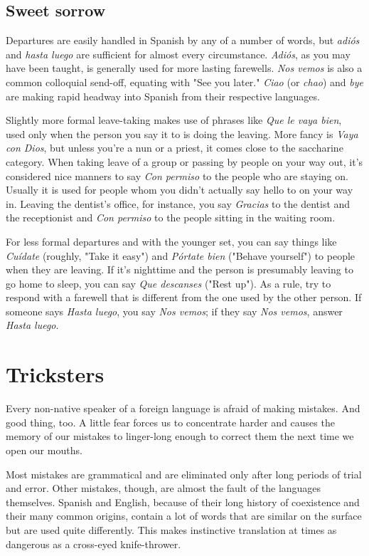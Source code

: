 \documentclass[14pt,a4paper,oneside]{memoir}
\begin{document}
\section{Sweet sorrow}

Departures are easily handled in Spanish by any of a number
of words, but \emph{adiós} and \emph{hasta luego} are sufficient for almost every circumstance. \emph{Adiós}, as you may have been taught, is generally used for
more lasting farewells. \emph{Nos vemos} is also a common colloquial send-off, equating with "See you later." \emph{Ciao} (or \emph{chao}) and \emph{bye} are making
rapid headway into Spanish from their respective languages.

Slightly more formal leave-taking makes use of phrases like
\emph{Que le vaya bien}, used only when the person you say it to is doing the
leaving. More fancy is \emph{Vaya con Dios}, but unless you're a nun or a
priest, it comes close to the saccharine category. When taking leave of
a group or passing by people on your way out, it's considered nice
manners to say \emph{Con permiso} to the people who are staying on. Usually it is
used for people whom you didn't actually say hello to on your way in.
Leaving the dentist's office, for instance, you say \emph{Gracias} to the dentist
and the receptionist and \emph{Con permiso} to the people sitting in the waiting room.

For less formal departures and with the younger set, you can
say things like \emph{Cuídate} (roughly, "Take it easy") and \emph{Pórtate bien} ("Behave yourself") to people when they are leaving. If it's nighttime and
the person is presumably leaving to go home to sleep, you can say \emph{Que
descanses} ("Rest up"). As a rule, try to respond with a farewell that is
different from the one used by the other person. If someone says \emph{Hasta
luego}, you say \emph{Nos vemos}; if they say \emph{Nos vemos}, answer \emph{Hasta luego}.

\chapter{Tricksters}

Every non-native speaker of a foreign language is afraid of
making mistakes. And good thing, too. A little fear forces us to concentrate harder and causes the memory of our mistakes to linger-long
enough to correct them the next time we open our mouths.

Most mistakes are grammatical and are eliminated only after
long periods of trial and error. Other mistakes, though, are almost the
fault of the languages themselves. Spanish and English, because of
their long history of coexistence and their many common origins, contain a lot of words that are similar on the surface but are used quite
differently. This makes instinctive translation at times as dangerous as
a cross-eyed knife-thrower.
\end{document}
